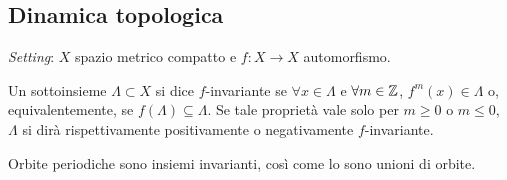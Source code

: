 \subsection{Dinamica topologica}
\emph{Setting}: $ X $ spazio metrico compatto e $ f\colon X\to X $ automorfismo.
\begin{definition}
    Un sottoinsieme $ \Lambda \subset X $ si dice $ f $-invariante se $ \forall x\in\Lambda $ e $ \forall m \in \mathbb{Z} $, $ f^m(x) \in \Lambda $ o, equivalentemente, se $ f(\Lambda) \subseteq \Lambda $.
    Se tale proprietà vale solo per $ m \geq 0 $ o $ m \leq 0 $, $ \Lambda $ si dirà rispettivamente positivamente o negativamente $ f $-invariante.
\end{definition}

\begin{oss}
    Orbite periodiche sono insiemi invarianti, così come lo sono unioni di orbite.
\end{oss}

